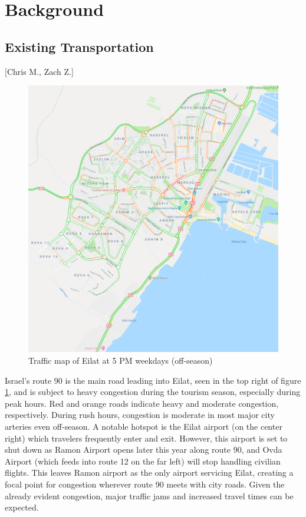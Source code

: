 \documentclass[12pt]{article}                         %
\begin{document}
\newpage
\section{Background}

\subsection{Existing Transportation}[Chris M., Zach Z.]

\begin{figure}[h]
    \centering
    \includegraphics[scale=1]{eilat_traffic.png}
    \caption{Traffic map of Eilat at 5 PM weekdays (off-season)}
    \label{img:eilatTraffic}
\end{figure}

Israel's route 90 is the main road leading into Eilat, seen in the top right of figure \ref{img:eilatTraffic}, and is subject to heavy congestion during the tourism season, especially during peak hours. Red and orange roads indicate heavy and moderate congestion, respectively. During rush hours, congestion is moderate in most major city arteries even off-season. A notable hotspot is the Eilat airport (on the center right) which travelers frequently enter and exit. However, this airport is set to shut down as Ramon Airport opens later this year along route 90, and Ovda Airport (which feeds into route 12 on the far left) will stop handling civilian flights. This leaves Ramon airport as the only airport servicing Eilat, creating a focal point for congestion wherever route 90 meets with city roads. Given the already evident congestion, major traffic jams and increased travel times can be expected.
\end{document}
